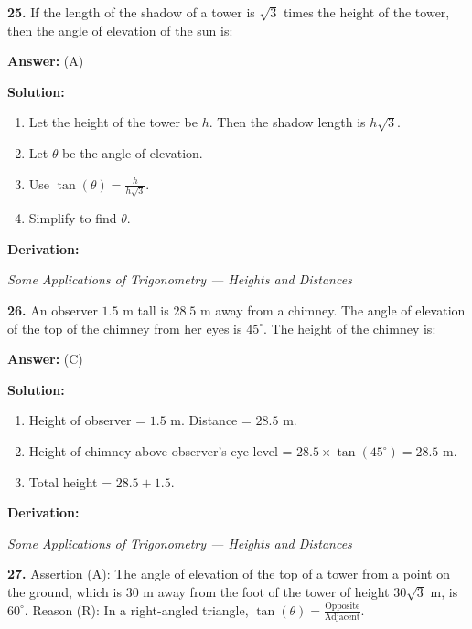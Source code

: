\documentclass[12pt,a4paper]{exam}
\newcommand{\fitmath}[1]{%
  \sbox{\schmathbox}{$\displaystyle #1$}%
  \ifdim\wd\schmathbox>\linewidth
    \resizebox{\linewidth}{!}{\usebox{\schmathbox}}%
  \else
    \usebox{\schmathbox}%
  \fi}
\begin{document}
\begin{questions}
\question \textbf{25.} If the length of the shadow of a tower is $\sqrt{3}$ times the height of the tower, then the angle of elevation of the sun is:

\textbf{Answer:}
(A)

\textbf{Solution:}
\begin{enumerate}
  \item Let the height of the tower be $h$. Then the shadow length is $h\sqrt{3}$.
  \item Let $\theta$ be the angle of elevation.
  \item Use $\tan(\theta) = \frac{h}{h\sqrt{3}}$.
  \item Simplify to find $\theta$.
\end{enumerate}
\textbf{Derivation:}
\begin{center}
\fitmath{\begin{aligned}
\tan(\theta) = \frac{h}{h\sqrt{3}} = \frac{1}{\sqrt{3}} \\
\implies \theta = 30^\circ
\end{aligned}}
\end{center}
\hfill \textit{Some Applications of Trigonometry — Heights and Distances}
\vspace{0.3cm}

\question \textbf{26.} An observer $1.5$ m tall is $28.5$ m away from a chimney. The angle of elevation of the top of the chimney from her eyes is $45^\circ$. The height of the chimney is:

\textbf{Answer:}
(C)

\textbf{Solution:}
\begin{enumerate}
  \item Height of observer = $1.5$ m. Distance = $28.5$ m.
  \item Height of chimney above observer's eye level = $28.5 \times \tan(45^\circ) = 28.5$ m.
  \item Total height = $28.5 + 1.5$.
\end{enumerate}
\textbf{Derivation:}
\begin{center}
\fitmath{H = 28.5 + 1.5 = 30 \text{ m}}
\end{center}
\hfill \textit{Some Applications of Trigonometry — Heights and Distances}
\vspace{0.3cm}

\question \textbf{27.} Assertion (A): The angle of elevation of the top of a tower from a point on the ground, which is $30 \text{ m}$ away from the foot of the tower of height $30 \sqrt{3} \text{ m}$, is $60^\circ$. 
Reason (R): In a right-angled triangle, $\tan(\theta) = \frac{\text{Opposite}}{\text{Adjacent}}$.


\end{questions}
\end{document}
